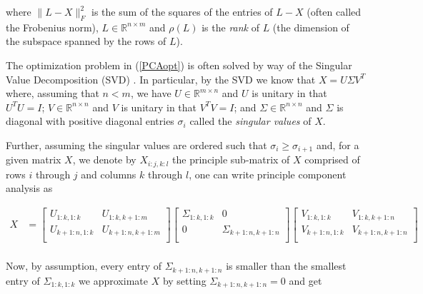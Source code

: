 \documentclass[conference]{IEEEtran}
\begin{document}
\noindent where $\| L-X \|_F^2$ is the sum of the squares of the entries of $L-X$ (often called the Frobenius norm), $L \in \mathbb{R}^{n \times m}$ and $\rho(L)$ is the \emph{rank} of $L$ (the dimension of the subspace spanned by the rows of $L$).

The optimization problem in (\ref{PCAopt}) is often solved by way of the Singular Value
Decomposition (SVD) \cite{Eckart1936}.  In particular, by the SVD we know that $X=U \Sigma V^T$ where, assuming that $n<m$, we have $U \in \mathbb{R}^{m \times n}$ and $U$ is unitary in that $U^T U = I$; $V \in \mathbb{R}^{n \times n}$ and $V$ is unitary in that $V^T V = I$; and $\Sigma \in \mathbb{R}^{n \times n}$ and $\Sigma$ is diagonal with positive diagonal entries $\sigma_i$ called the \emph{singular values} of $X$.

Further, assuming the singular values are ordered such that $\sigma_i \ge \sigma_{i+1}$
and, for a given matrix $X$, we denote by $X_{i:j,k:l}$ the principle sub-matrix of $X$ comprised of rows $i$ through $j$ and columns $k$ through $l$, one can write principle component analysis as 

\begin{align*}
X 
& = 
\begin{bmatrix}
U_{1:k,1:k} & U_{1:k,k+1:m} \\
U_{k+1:n,1:k} & U_{k+1:n,k+1:m} \\
\end{bmatrix}
\begin{bmatrix}
\Sigma_{1:k,1:k} & 0 \\
0 & \Sigma_{k+1:n,k+1:n} \\
\end{bmatrix}
\begin{bmatrix}
V_{1:k,1:k} & V_{1:k,k+1:n} \\
V_{k+1:n,1:k} & V_{k+1:n,k+1:n} \\
\end{bmatrix} \\
\end{align*}

\noindent Now, by assumption, every entry of $\Sigma_{k+1:n,k+1:n}$ is smaller than the smallest
entry of $\Sigma_{1:k,1:k}$ we approximate $X$ by setting $\Sigma_{k+1:n,k+1:n}=0$
and get
\end{document}
